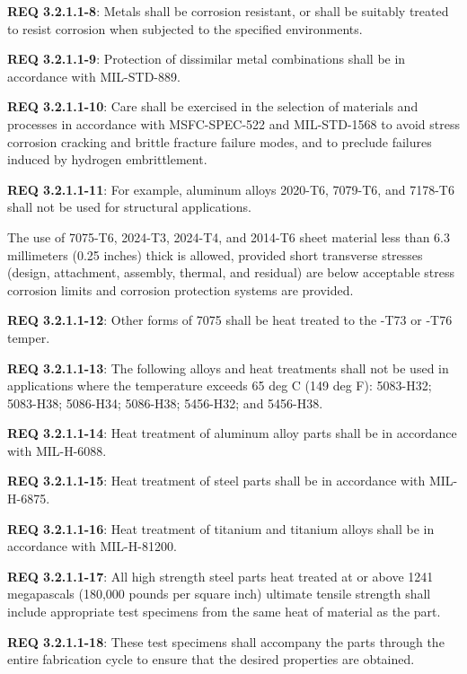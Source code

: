 \documentclass[12pt]{article}
\begin{document}
\noindent \textbf{REQ 3.2.1.1-8}: Metals shall be corrosion resistant, or shall be suitably treated to resist corrosion when subjected to the specified environments. 

\noindent \textbf{REQ 3.2.1.1-9}: Protection of dissimilar metal combinations shall be in accordance with MIL-STD-889. 

\noindent \textbf{REQ 3.2.1.1-10}: Care shall be exercised in the selection of materials and processes in accordance with MSFC-SPEC-522 and MIL-STD-1568 to avoid stress corrosion cracking and brittle fracture failure modes, and to preclude failures induced by hydrogen embrittlement. 

\noindent \textbf{REQ 3.2.1.1-11}: For example, aluminum alloys 2020-T6, 7079-T6, and 7178-T6 shall not be used for structural applications. 

The use of 7075-T6, 2024-T3, 2024-T4, and 2014-T6 sheet material less than 6.3 millimeters (0.25 inches) thick is allowed, provided short transverse stresses (design, attachment, assembly, thermal, and residual) are below acceptable stress corrosion limits and corrosion protection systems are provided. 

\noindent \textbf{REQ 3.2.1.1-12}: Other forms of 7075 shall be heat treated to the -T73 or -T76 temper.

\noindent \textbf{REQ 3.2.1.1-13}: The following alloys and heat treatments shall not be used in applications where the temperature exceeds 65 deg C (149 deg F): 5083-H32; 5083-H38; 5086-H34; 5086-H38; 5456-H32; and 5456-H38. 

\noindent \textbf{REQ 3.2.1.1-14}: Heat treatment of aluminum alloy parts shall be in accordance with MIL-H-6088. 

\noindent \textbf{REQ 3.2.1.1-15}: Heat treatment of steel parts shall be in accordance with MIL-H-6875. 

\noindent \textbf{REQ 3.2.1.1-16}: Heat treatment of titanium and titanium alloys shall be in accordance with MIL-H-81200.

\noindent \textbf{REQ 3.2.1.1-17}: All high strength steel parts heat treated at or above 1241 megapascals (180,000 pounds per square inch) ultimate tensile strength shall include appropriate test specimens from the same heat of material as the part. 

\noindent \textbf{REQ 3.2.1.1-18}: These test specimens shall accompany the parts through the entire fabrication cycle to ensure that the desired properties are obtained. 
\end{document}
